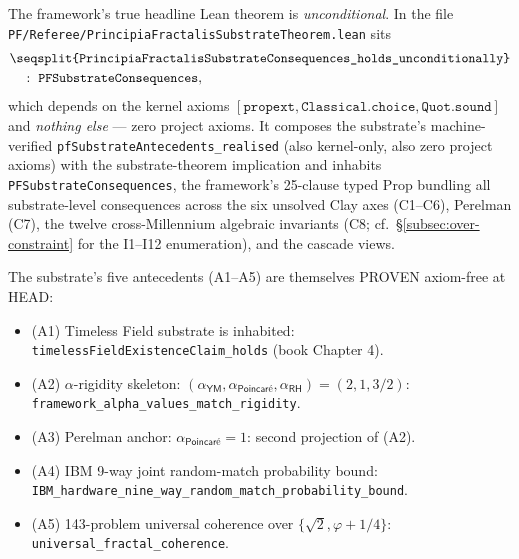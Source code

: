 \documentclass[11pt,a4paper]{amsart}
\theoremstyle{plain}
\theoremstyle{definition}
\newcommand{\lt}[1]{\texttt{\seqsplit{#1}}}
\begin{document}
The framework's true headline Lean theorem is \emph{unconditional}. In the file \texttt{PF/Referee/PrincipiaFractalisSubstrateTheorem.lean} sits
\begin{align*}
&\lt{PrincipiaFractalisSubstrateConsequences\_holds\_unconditionally}\\
&\quad :\ \texttt{PFSubstrateConsequences},
\end{align*}
which depends on the kernel axioms $[\texttt{propext}, \texttt{Classical.choice}, \texttt{Quot.sound}]$ and \emph{nothing else} --- zero project axioms. It composes the substrate's machine-verified \texttt{pfSubstrateAntecedents\_realised} (also kernel-only, also zero project axioms) with the substrate-theorem implication and inhabits \texttt{PFSubstrateConsequences}, the framework's 25-clause typed Prop bundling all substrate-level consequences across the six unsolved Clay axes (C1--C6), Perelman (C7), the twelve cross-Millennium algebraic invariants (C8; cf.~\S\ref{subsec:over-constraint} for the I1--I12 enumeration), and the cascade views.

The substrate's five antecedents (A1--A5) are themselves PROVEN axiom-free at HEAD:
\begin{itemize}[itemsep=2pt,leftmargin=2em]
\item (A1) Timeless Field substrate is inhabited: \texttt{timelessFieldExistenceClaim\_holds} (book Chapter 4).
\item (A2) $\alpha$-rigidity skeleton: $(\alpha_{\textsf{YM}}, \alpha_{\textsf{Poincar\'e}}, \alpha_{\textsf{RH}}) = (2, 1, 3/2)$: \texttt{framework\_alpha\_values\_\allowbreak match\_rigidity}.
\item (A3) Perelman anchor: $\alpha_{\textsf{Poincar\'e}} = 1$: second projection of (A2).
\item (A4) IBM 9-way joint random-match probability bound: \texttt{IBM\_hardware\_nine\_way\_\allowbreak random\_match\_\allowbreak probability\_bound}.
\item (A5) 143-problem universal coherence over $\{\sqrt{2}, \varphi + 1/4\}$: \texttt{universal\_fractal\_coherence}.
\end{itemize}
\end{document}
